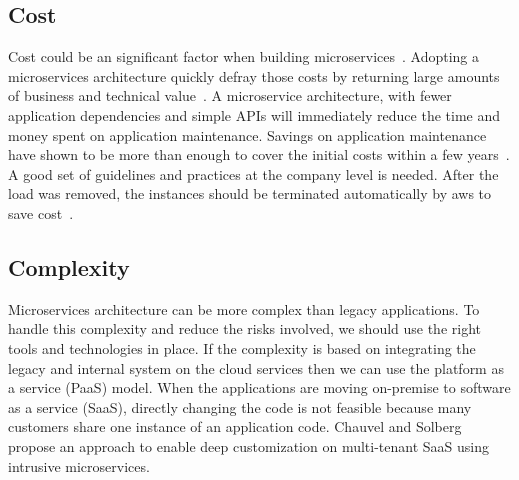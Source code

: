 \subsection{Cost}%
Cost could be an significant factor when building microservices~\cite{Koschel2017, Netflix, Michael2018}. 
%
Adopting a microservices architecture quickly defray those costs by returning large amounts of business and technical value~\cite{McElhiney2018, Leo2019}. A microservice architecture, with fewer application dependencies and simple APIs will immediately reduce the time and money spent on application maintenance. Savings on application maintenance have shown to be more than enough to cover the initial costs within a few years~\cite{Otharson2019}. 
A good set of guidelines and practices at the company level is needed. After the load was removed, the instances should be terminated automatically by aws to save cost~\cite{McElhiney2018}. 


\subsection{Complexity}%
Microservices architecture can be more complex than legacy applications. To handle this complexity and reduce the risks involved, we should use the right tools and technologies in place.
If the complexity is based on integrating the legacy and internal system on the cloud services then we can use the platform as a service (PaaS) model\cite{rosa2018}. When the applications are moving on-premise to software as a service (SaaS), directly changing the code is not feasible because many customers share one instance of an application code.
%
Chauvel and Solberg~\cite{chauvel2018} propose an approach to enable deep customization on multi-tenant SaaS using intrusive microservices.

